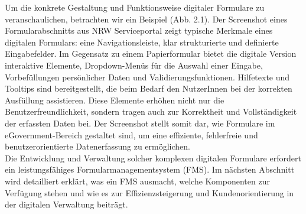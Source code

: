 Um die konkrete Gestaltung und Funktionsweise digitaler Formulare zu veranschaulichen, betrachten wir ein Beispiel (Abb. 2.1). Der Screenshot eines Formularabschnitts aus NRW Serviceportal zeigt typische Merkmale eines digitalen Formulars: eine Navigationsleiste, klar strukturierte und definierte Eingabefelder. Im Gegensatz zu einem Papierformular bietet die digitale Version interaktive Elemente, Dropdown-Menüs für die Auswahl einer Eingabe, Vorbefüllungen persönlicher Daten und Validierungsfunktionen. Hilfetexte und Tooltips sind bereitgestellt, die beim Bedarf den NutzerInnen bei der korrekten Ausfüllung assistieren. Diese Elemente erhöhen nicht nur die Benutzerfreundlichkeit, sondern tragen auch zur Korrektheit und Vollständigkeit der erfassten Daten bei. Der Screenshot stellt somit dar, wie Formulare im eGovernment-Bereich gestaltet sind, um eine effiziente, fehlerfreie und benutzerorientierte Datenerfassung zu ermöglichen. \\

Die Entwicklung und Verwaltung solcher komplexen digitalen Formulare erfordert ein leistungsfähiges Formularmanagementsystem (FMS). Im nächsten Abschnitt wird detailliert erklärt, was ein FMS ausmacht, welche Komponenten zur Verfügung stehen und wie es zur Effizienzsteigerung und Kundenorientierung in der digitalen Verwaltung beiträgt.











